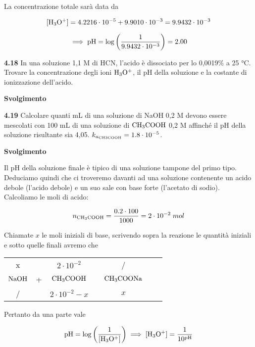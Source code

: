 La concentrazione totale sarà data da

$$[\rm H_3O^+]=4.2216 \cdot 10^{-5} + 9.9010\cdot 10^{-3}=9.9432 \cdot 10^{-3}$$

$$\implies
\rm pH=\log{\left(\frac{1}{9.9432 \cdot 10^{-3}}\right)}
=2.00$$

\vspace{0.2cm}\textbf{4.18}  In una soluzione 1,1 M di HCN, l'acido è dissociato per lo 0,0019\% a 25 °C. Trovare la concentrazione degli ioni $\rm H_3O^+$, il pH della soluzione e la costante di ionizzazione dell'acido. 

\vspace{0.2cm}\large\textbf{Svolgimento}\normalsize

\vspace{0.2cm}

\vspace{0.2cm}\textbf{4.19}  Calcolare quanti mL di una soluzione di NaOH 0,2 M devono essere mescolati con
100 mL di una soluzione di $\rm CH_3COOH$ 0,2 M affinché il pH della soluzione risultante sia 4,05. $k_{a_{\rm CH3COOH}}=1.8 \cdot 10^{-5}$.

\vspace{0.2cm}\large\textbf{Svolgimento}\normalsize

\vspace{0.2cm}Il pH della soluzione finale è tipico di una soluzione tampone del primo tipo. Deduciamo quindi che ci troveremo davanti ad una soluzione contenente un acido debole (l'acido debole) e un suo sale con base forte (l'acetato di sodio). Calcoliamo le moli di acido:

$$n_{\rm CH_3COOH}=\frac{0.2 \cdot 100}{1000}=2 \cdot 10^{-2}\;mol$$

Chiamate $x$ le moli iniziali di base, scrivendo sopra la reazione le quantità iniziali e sotto quelle finali avremo che

\begin{center}
    \begin{tabular}{ccccccc}
        x & & $2 \cdot 10^{-2}$ & & /\\
        $\rm NaOH$ & + & $\rm CH_3COOH$ & \ce{<-->} & $\rm CH_3COONa$\\
        / & & $2 \cdot 10^{-2} - x$ & & $x$\\
    \end{tabular}
\end{center}


Pertanto da una parte vale

$$\rm pH=\log{\left(\frac{1}{[H_3O^+]}\right)}
\implies
[H_3O^+]=\frac{1}{10^{pH}}$$

